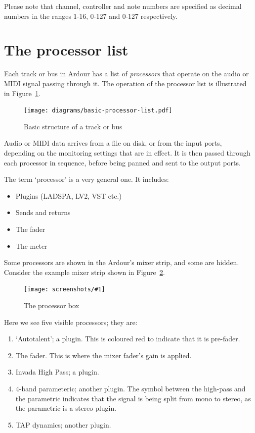 \documentclass[10pt,a4paper]{book}
\newcommand{\screenshot}[3]{%
\begin{figure}[ht]%
\begin{center}
\texttt{[image: screenshots/\#1]}
\end{center}
\caption{#2}
\label{#3}
\end{figure}}
\begin{document}
{Please note that channel, controller and note numbers are specified as
decimal numbers in the ranges 1-16, 0-127 and 0-127 respectively.


\section{The processor list}

Each track or bus in Ardour has a list of \emph{processors} that
operate on the audio or MIDI signal passing through it.  The operation
of the processor list is illustrated in
Figure~\ref{fig:basic-processor-list}.

\begin{figure}[ht]
\begin{center}
\texttt{[image: diagrams/basic-processor-list.pdf]}
\end{center}
\caption{Basic structure of a track or bus}
\label{fig:basic-processor-list}
\end{figure}

Audio or MIDI data arrives from a file on disk, or from the input
ports, depending on the monitoring settings that are in effect.  It is
then passed through each processor in sequence, before being panned
and sent to the output ports.

The term `processor' is a very general one.  It includes:

\begin{itemize}
\item Plugins (LADSPA, LV2, VST etc.)
\item Sends and returns
\item The fader
\item The meter
\end{itemize}

Some processors are shown in the Ardour's mixer strip, and some are
hidden.  Consider the example mixer strip shown in Figure~\ref{fig:processor-box}.

\screenshot{processor-box.png}{The processor box}{fig:processor-box}

Here we see five visible processors; they are:

\begin{enumerate}
\item `Autotalent'; a plugin.  This is coloured red to indicate
  that it is pre-fader.
\item The fader.  This is where the mixer fader's gain is applied.
\item Invada High Pass; a plugin.
\item 4-band parameteric; another plugin.  The symbol between the
  high-pass and the parametric indicates that the signal is being
  split from mono to stereo, as the parametric is a stereo plugin.
\item TAP dynamics; another plugin.
\end{enumerate}

}
\end{document}
